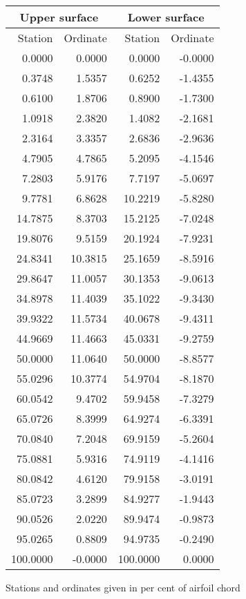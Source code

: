 \documentclass[11pt]{book}
\begin{document}
 \hspace{4mm}
 \begin{tabular}{|r|r|r|r|} \hline 
 \multicolumn{2}{|c|}{Upper surface} & \multicolumn{2}{|c|}{Lower surface} \\
 \hline
 Station & Ordinate & Station & Ordinate \\
 \hline
0.0000 & 0.0000 & 0.0000 & -0.0000 \\
0.3748 & 1.5357 & 0.6252 & -1.4355 \\
0.6100 & 1.8706 & 0.8900 & -1.7300 \\
1.0918 & 2.3820 & 1.4082 & -2.1681 \\
2.3164 & 3.3357 & 2.6836 & -2.9636 \\
4.7905 & 4.7865 & 5.2095 & -4.1546 \\
7.2803 & 5.9176 & 7.7197 & -5.0697 \\
9.7781 & 6.8628 & 10.2219 & -5.8280 \\
14.7875 & 8.3703 & 15.2125 & -7.0248 \\
19.8076 & 9.5159 & 20.1924 & -7.9231 \\
24.8341 & 10.3815 & 25.1659 & -8.5916 \\
29.8647 & 11.0057 & 30.1353 & -9.0613 \\
34.8978 & 11.4039 & 35.1022 & -9.3430 \\
39.9322 & 11.5734 & 40.0678 & -9.4311 \\
44.9669 & 11.4663 & 45.0331 & -9.2759 \\
50.0000 & 11.0640 & 50.0000 & -8.8577 \\
55.0296 & 10.3774 & 54.9704 & -8.1870 \\
60.0542 & 9.4702 & 59.9458 & -7.3279 \\
65.0726 & 8.3999 & 64.9274 & -6.3391 \\
70.0840 & 7.2048 & 69.9159 & -5.2604 \\
75.0881 & 5.9316 & 74.9119 & -4.1416 \\
80.0842 & 4.6120 & 79.9158 & -3.0191 \\
85.0723 & 3.2899 & 84.9277 & -1.9443 \\
90.0526 & 2.0220 & 89.9474 & -0.9873 \\
95.0265 & 0.8809 & 94.9735 & -0.2490 \\
100.0000 & -0.0000 & 100.0000 & 0.0000 \\
 \hline 
 \end{tabular}
 \vspace{8mm}

Stations and ordinates given in per cent of airfoil chord
\end{document}
